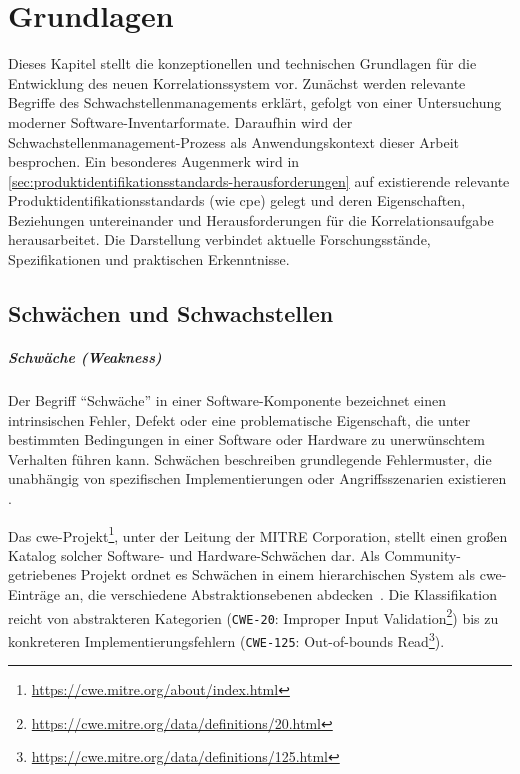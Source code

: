 \chapter{Grundlagen}\label{ch:grundlagen}

Dieses Kapitel stellt die konzeptionellen und technischen Grundlagen für die Entwicklung des neuen Korrelationssystem vor.
Zunächst werden relevante Begriffe des Schwachstellenmanagements erklärt, gefolgt von einer Untersuchung moderner Software-Inventarformate.
Daraufhin wird der Schwachstellenmanagement-Prozess als Anwendungskontext dieser Arbeit besprochen.
Ein besonderes Augenmerk wird in \autoref{sec:produktidentifikationsstandards-herausforderungen} auf existierende relevante Produktidentifikationsstandards (wie \acrshort{cpe}) gelegt und deren Eigenschaften, Beziehungen untereinander und Herausforderungen für die Korrelationsaufgabe herausarbeitet.
Die Darstellung verbindet aktuelle Forschungsstände, Spezifikationen und praktischen Erkenntnisse.

\section{Schwächen und Schwachstellen}\label{sec:def-weakness-vulnerability}

\paragraph{Schwäche (Weakness)}

Der Begriff \enquote{Schwäche} in einer Software-Komponente bezeichnet einen intrinsischen Fehler, Defekt oder eine problematische Eigenschaft, die unter bestimmten Bedingungen in einer Software oder Hardware zu unerwünschtem Verhalten führen kann.
Schwächen beschreiben grundlegende Fehlermuster, die unabhängig von spezifischen Implementierungen oder Angriffsszenarien existieren \autocite{Ross_Winstead_McEvilley_2022}.

Das \acrfull{cwe}-Projekt\footnote{\url{https://cwe.mitre.org/about/index.html}}, unter der Leitung der MITRE Corporation, stellt einen großen Katalog solcher Software- und Hardware-Schwächen dar.
Als Community-getriebenes Projekt ordnet es Schwächen in einem hierarchischen System als \acrshort{cwe}-Einträge an, die verschiedene Abstraktionsebenen abdecken\ \autocite{wu2016cwe}.
Die Klassifikation reicht von abstrakteren Kategorien (\verb+CWE-20+: Improper Input Validation\footnote{\url{https://cwe.mitre.org/data/definitions/20.html}}) bis zu konkreteren Implementierungsfehlern (\verb+CWE-125+: Out-of-bounds Read\footnote{\url{https://cwe.mitre.org/data/definitions/125.html}}).

